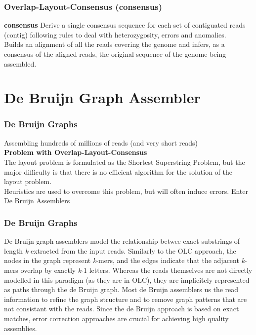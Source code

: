 \documentclass[pdf]{beamer}
\begin{document}
\begin{frame}
\frametitle{Overlap-Layout-Consensus (consensus)}
\textbf{consensus}
Derive a single consensus sequence for each set of contiguated reads (contig) following rules to deal with heterozygosity, errors and anomalies.\\
Builds an alignment of all the reads covering the genome and infers, as a consensus of the aligned reads, the original sequence of the genome being assembled.
\end{frame}

\section{De Bruijn Graph Assembler}
\begin{frame}
\frametitle{De Bruijn Graphs}
Assembling hundreds of millions of reads (and very short reads)\\
\vspace{0.2in}
\textbf{Problem with Overlap-Layout-Consensus}\\
The layout problem is formulated as the Shortest Superstring Problem, but the major difficulty is that there is no efficient algorithm for the solution of the layout problem.\\
\vspace{0.2in}
Heuristics are used to overcome this problem, but will often induce errors.
\vspace{0.1in}
Enter De Bruijn Assemblers
\end{frame}

\begin{frame}
\frametitle{De Bruijn Graphs}
De Bruijn graph assemblers model the relationship betwee exact substrings of length \textit{k} extracted from the input reads. Similarly to the OLC approach, the nodes in the graph represent \textit{k}-mers, and the edges indicate that the adjacent \textit{k}-mers overlap by exactly \textit{k}-1 letters. Whereas the reads themselves are not directly modelled in this paradigm (as they are in OLC), they are implicitely represented as paths through the de Bruijn graph. 
\vspace{0.1in}
Most de Bruijn assemblers us the read information to refine the graph structure and to remove graph patterns that are not consistant with the reads. Since the de Bruijn approach is based on exact matches, error correction approaches are crucial for achieving high quality assemblies.
\end{frame}
\end{document}
